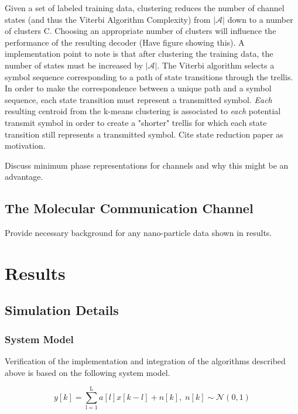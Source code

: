 \documentclass[12pt,a4paper]{report}
\begin{document}
Given a set of labeled training data, clustering reduces the number of channel states (and thus the Viterbi Algorithm Complexity) from $|\mathcal{A}|$ down to a number of clusters C. Choosing an appropriate number of clusters will influence the performance of the resulting decoder (Have figure showing this).
A implementation point to note is that after clustering the training data, the number of states must be increased by $|\mathcal{A}|$. The Viterbi algorithm selects a symbol sequence corresponding to a path of state transitions through the trellis. In order to make the correspondence between a unique path and a symbol sequence, each state transition must represent a transmitted symbol. \emph{Each} resulting centroid from the k-means clustering is associated to \emph{each} potential transmit symbol in order to create a "shorter" trellis for which each state transition still represents a transmitted symbol. 
Cite state reduction paper as motivation. 

Discuss minimum phase representations for channels and why this might be an advantage. 

\subsection{The Molecular Communication Channel}
Provide necessary background for any nano-particle data shown in results. 



\section{Results}
\subsection{Simulation Details}
\subsubsection{System Model}
Verification of the implementation and integration of the algorithms described above is based on the following system model.

%


\begin{equation}
y[k] = \sum_{\mathrm{l=1}}^{\mathrm{L}} a[l]x[k-l] + n[k], \; n[k]  \sim \mathcal{N}(0,1)
\end{equation}
\end{document}
